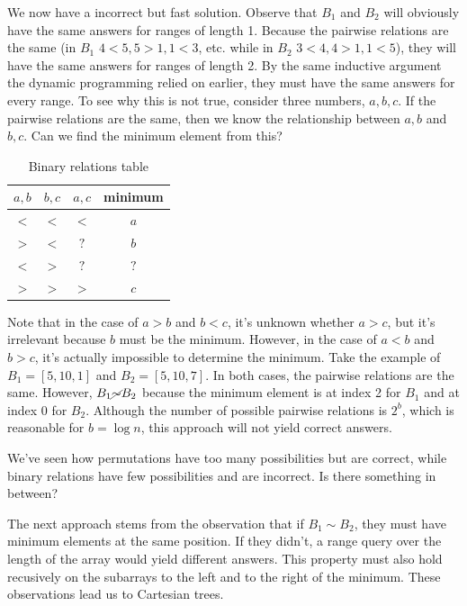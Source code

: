 \documentclass[11pt, oneside]{article}
\begin{document}
We now have a incorrect but fast solution. Observe that \( B_1 \) and \( B_2 \) will obviously
have the same answers for ranges of length 1. Because the pairwise relations are the same (in \( B_1 \) \( 4 < 5, 5 > 1, 1 < 3 \), etc.
while in \( B_2 \) \(3 < 4, 4 > 1, 1 < 5 \)), they will have the same answers for ranges of length 2.
By the same inductive argument the dynamic programming relied on earlier, they must have the same answers for every range.
To see why this is not true, consider three numbers, \( a, b, c \). If the pairwise relations are the same,
then we know the relationship between \( a, b \) and \( b, c \). Can we find the minimum element from this?

\newpage

\begin{table}[ht!]
\centering
\begin{tabular}{ cccc }
 \( a, b \) & \( b, c \) & \( a, c \) & minimum \\
 \hline
 \( < \) & \( < \) & \( < \) & \( a \) \\
 \( > \) & \( < \) & \( ? \) & \( b \) \\
 \( < \) & \( > \) & \( ? \) & \( ? \) \\
 \( > \) & \( > \) & \( > \) & \( c \) \\
 \hline
\end{tabular}
\caption{Binary relations table}
\end{table}

Note that in the case of \( a > b \) and \( b < c \), it's unknown whether \( a > c \),
but it's irrelevant because \( b \) must be the minimum. However, in the case of \( a < b \)
and \( b > c \), it's actually impossible to determine the minimum. Take the example of
\( B_1 = [5, 10, 1] \) and \( B_2 = [5, 10, 7] \). In both cases, the pairwise relations are the same.
However, \( B_1 \cancel{\sim} B_2 \) because the minimum element is at index 2 for \( B_1 \) and
at index 0 for \( B_2 \). Although the number of possible pairwise relations is \( 2^b \), which is reasonable
for \( b = \log n \), this approach will not yield correct answers.

We've seen how permutations have too many possibilities but are correct, while binary relations have
few possibilities and are incorrect. Is there something in between?

The next approach stems from the observation that if \( B_1 \sim B_2 \), they must have minimum elements
at the same position. If they didn't, a range query over the length of the array would yield different answers.
This property must also hold recusively on the subarrays to the left and to the right of the minimum.
These observations lead us to Cartesian trees.
\end{document}
